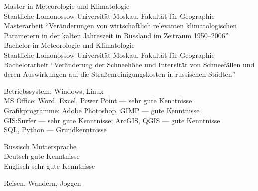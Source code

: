 \documentclass[11pt]{developercv} %
\begin{document}

\begin{entrylist}
    {Master in Meteorologie und Klimatologie\\}
    {Staatliche Lomonossow-Universität Moskau, Fakultät für Geographie}
    {Masterarbeit ``Veränderungen von wirtschaftlich relevanten klimatologischen Parametern in der kalten Jahreszeit in Russland im Zeitraum 1950–2006''}
    {Bachelor in Meteorologie und Klimatologie\\}
    {Staatliche Lomonossow-Universität Moskau, Fakultät für Geographie}
    {Bachelorarbeit ``Veränderung der Schneehöhe und Intensität von Schneefällen und deren Auswirkungen auf die Straßenreinigungskosten in russischen Städten''}
\end{entrylist}

\begin{entrylist}
\end{entrylist}



  Betriebssystem: Windows, Linux\\
  MS Office: Word, Excel, Power Point --- sehr gute Kenntnisse\\
  Grafikprogramme: Adobe Photoshop, GIMP --- gute Kenntnisse\\
  GIS:\@ Surfer --- sehr gute Kenntnisse; ArcGIS, QGIS --- gute Kenntnisse\\
  SQL, Python --- Grundkenntnisse\\


Russisch Muttersprache\\
Deutsch gute Kenntnisse\\
Englisch sehr gute Kenntnisse\\


Reisen, Wandern, Joggen

\end{document}
